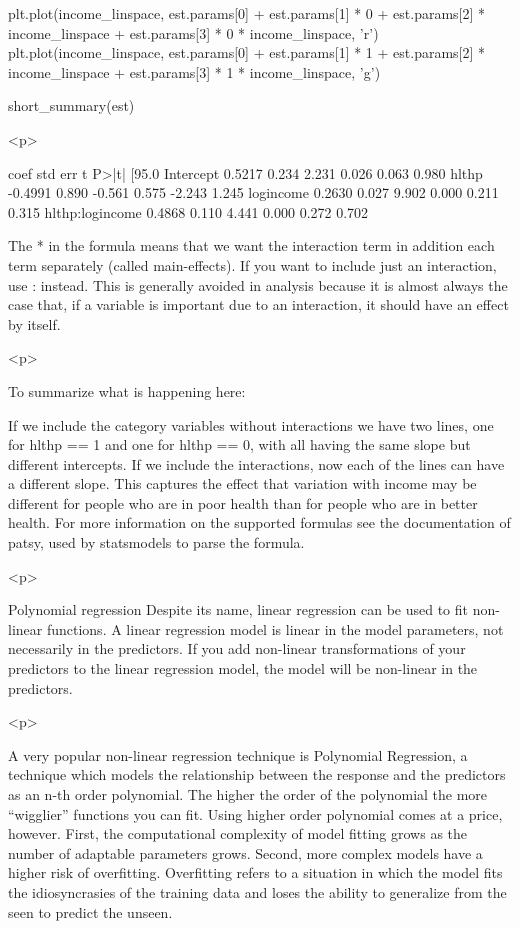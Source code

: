 plt.plot(income_linspace, est.params[0] + est.params[1] * 0 + est.params[2] * income_linspace + 
         est.params[3] * 0 * income_linspace, 'r')
plt.plot(income_linspace, est.params[0] + est.params[1] * 1 + est.params[2] * income_linspace + 
         est.params[3] * 1 * income_linspace, 'g')

short_summary(est)


<p>

	
coef	std err	t	P>|t|	[95.0%
Intercept	0.5217	0.234	2.231	0.026	0.063 0.980
hlthp	-0.4991	0.890	-0.561	0.575	-2.243 1.245
logincome	0.2630	0.027	9.902	0.000	0.211 0.315
hlthp:logincome	0.4868	0.110	4.441	0.000	0.272 0.702

The * in the formula means that we want the interaction term in addition each term separately (called main-effects). If you want to include just an interaction, use : instead. This is generally avoided in analysis because it is almost always the case that, if a variable is important due to an interaction, it should have an effect by itself.


<p>

	
To summarize what is happening here:

If we include the category variables without interactions we have two lines, one for hlthp == 1 and one for hlthp == 0, with all having the same slope but different intercepts.
If we include the interactions, now each of the lines can have a different slope. This captures the effect that variation with income may be different for people who are in poor health than for people who are in better health.
For more information on the supported formulas see the documentation of patsy, used by statsmodels to parse the formula.


<p>

	
Polynomial regression
Despite its name, linear regression can be used to fit non-linear functions. A linear regression model is linear in the model parameters, not necessarily in the predictors. If you add non-linear transformations of your predictors to the linear regression model, the model will be non-linear in the predictors.


<p>

	
A very popular non-linear regression technique is Polynomial Regression, a technique which models the relationship between the response and the predictors as an n-th order polynomial. The higher the order of the polynomial the more “wigglier” functions you can fit. Using higher order polynomial comes at a price, however. First, the computational complexity of model fitting grows as the number of adaptable parameters grows. Second, more complex models have a higher risk of overfitting. Overfitting refers to a situation in which the model fits the idiosyncrasies of the training data and loses the ability to generalize from the seen to predict the unseen.


